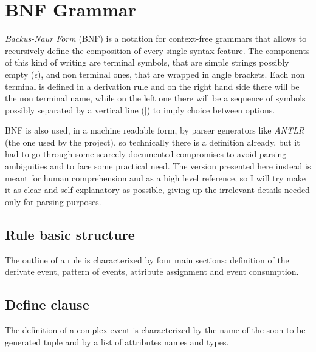 \section{BNF Grammar}

\emph{Backus-Naur Form} (BNF) is a notation for context-free grammars that allows to recursively define the composition of every single syntax feature. The components of this kind of writing are terminal symbols, that are simple strings possibly empty ($\epsilon$), and non terminal ones, that are wrapped in angle brackets. Each non terminal is defined in a derivation rule and on the right hand side there will be the non terminal name, while on the left one there will be a sequence of symbols possibly separated by a vertical line ($|$) to imply choice between options.

BNF is also used, in a machine readable form, by parser generators like \emph{ANTLR} (the one used by the project), so technically there is a definition already, but it had to go through some scarcely documented compromises to avoid parsing ambiguities and to face some practical need. The version presented here instead is meant for human comprehension and as a high level reference, so I will try make it as clear and self explanatory as possible, giving up the irrelevant details needed only for parsing purposes.

\subsection{Rule basic structure}
The outline of a rule is characterized by four main sections: definition of the derivate event, pattern of events, attribute assignment and event consumption.
\begin{bnf*}
\end{bnf*}

\subsection{Define clause}
The definition of a complex event is characterized by the name of the soon to be generated tuple and by a list of attributes names and types.
\begin{bnf*}
\end{bnf*}
\begin{bnf*}
\\
\\
\\
\end{bnf*}

